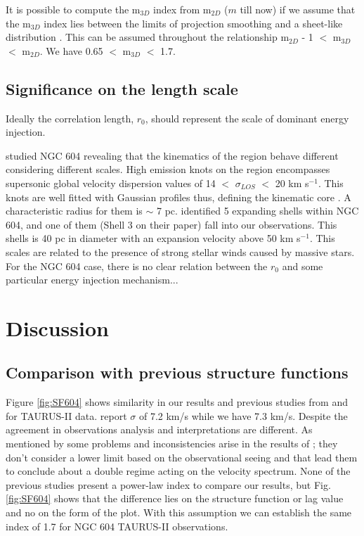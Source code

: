 \documentclass[fleqn,usenatbib, useAMS, a4paper]{mnras}
\begin{document}
It is possible to compute the m$_{3D}$ index from m$_{2D}$ ($m$ till now) if we assume that the m$_{3D}$ index lies between the limits of projection smoothing and a sheet-like distribution \citep{arthur2016turbulence}. This can be assumed throughout the relationship m$_{2D}$ - 1 $<$ m$_{3D}$ $<$ m$_{2D}$. We have 0.65 $<$ m$_{3D}$ $<$ 1.7.

\subsection{Significance on the length scale}

Ideally the correlation length, \(r_0\), should represent the scale of dominant energy injection. 

\cite{sabalisck1995supersonic} studied NGC 604 revealing that the kinematics of the region behave different considering different scales. High emission knots on the region encompasses supersonic global velocity dispersion values of 14 $<$ \(\sigma_{LOS}\) $<$ 20 km s\(^{-1}\). This knots are well fitted with Gaussian profiles thus, defining the kinematic core \cite{munoz1996}. A characteristic radius for them is \(\sim\) 7 pc. \cite{yang1996} identified 5 expanding shells within NGC 604, and one of them (Shell 3 on their paper) fall into our observations. This shells is 40 pc in diameter with an expansion velocity above 50 km s\(^{-1}\). This scales are related to the presence of strong stellar winds caused by massive stars. For the NGC 604 case, there is no clear relation between the \(r_0\) and some particular energy injection mechanism...







\section{Discussion}\label{sec:discussion}

\subsection{Comparison with previous structure functions}

Figure \ref{fig:SF604} shows similarity in our results and previous studies from \cite{tanco1997} and \cite{2019arXiv191203543M} for TAURUS-II data. \citep{2019arXiv191203543M} report $\sigma$ of 7.2 km/s while we have 7.3 km/s. Despite the agreement in observations analysis and interpretations are different. As mentioned by \cite{2019arXiv191203543M} some problems and inconsistencies arise in the results of \cite{tanco1997}; they don't consider a lower limit based on the observational seeing and that lead them to conclude about a double regime acting on the velocity spectrum. None of the previous studies present a power-law index to compare our results, but  Fig. \ref{fig:SF604} shows that the difference lies on the structure function or lag value and no on the form of the plot. With this assumption we can establish the same index of 1.7 for NGC 604 TAURUS-II observations.
\end{document}
